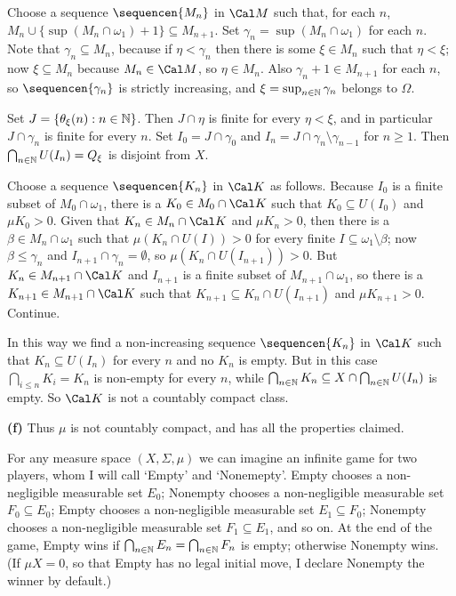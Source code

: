 {\medskip

 Choose a sequence $\sequencen{M_n}$ in $\Cal M$ such
that, for each $n$, $M_n\cup\{\sup(M_n\cap\omega_1)+1\}\subseteq
M_{n+1}$.   Set $\gamma_n=\sup(M_n\cap\omega_1)$ for each $n$.   Note
that $\gamma_n\subseteq M_n$, because if $\eta<\gamma_n$ then there is
some $\xi\in M_n$ such that $\eta<\xi$;  now $\xi\subseteq M_n$
because $M_n\in\Cal M$, so $\eta\in M_n$.   Also
$\gamma_n+1\in M_{n+1}$ for each $n$, so $\sequencen{\gamma_n}$ is
strictly increasing, and $\xi=\sup_{n\in\Bbb N}\gamma_n$ belongs to
$\Omega$.

Set $J=\{\theta_{\xi}(n):n\in\Bbb N\}$.   Then $J\cap\eta$ is finite for
every $\eta<\xi$, and in particular $J\cap\gamma_n$ is finite for every
$n$.   Set $I_0=J\cap\gamma_0$ and
$I_n=J\cap\gamma_n\setminus\gamma_{n-1}$ for $n\ge 1$.   Then
$\bigcap_{n\in\Bbb N}U(I_n)=Q_{\xi}$ is disjoint from $X$.

Choose a sequence $\sequencen{K_n}$ in $\Cal K$ as follows.   Because
$I_0$ is a finite subset of $M_0\cap\omega_1$, there is a $K_0\in
M_0\cap\Cal K$ such that
$K_0\subseteq U(I_0)$ and $\mu K_0>0$.    Given that $K_n\in M_n\cap\Cal
K$ and $\mu K_n>0$, then there is a $\beta\in M_n\cap\omega_1$ such that
$\mu(K_n\cap U(I))>0$ for every finite
$I\subseteq\omega_1\setminus\beta$;  now $\beta\le\gamma_n$ and
$I_{n+1}\cap\gamma_n=\emptyset$, so $\mu(K_n\cap U(I_{n+1}))>0$.   But
$K_n\in M_{n+1}\cap\Cal K$ and $I_{n+1}$ is a finite subset of
$M_{n+1}\cap\omega_1$, so there is a $K_{n+1}\in M_{n+1}\cap\Cal K$ such
that $K_{n+1}\subseteq K_n\cap U(I_{n+1})$ and $\mu K_{n+1}>0$.
Continue.

In this way we find a non-increasing sequence $\sequencen{K_n}$ in $\Cal
K$ such that $K_n\subseteq U(I_n)$ for every $n$ and no $K_n$ is empty.
But in this case $\bigcap_{i\le n}K_i=K_n$ is non-empty for every $n$,
while $\bigcap_{n\in\Bbb N}K_n\subseteq X\cap\bigcap_{n\in\Bbb N}U(I_n)$
is empty.   So $\Cal K$ is not a countably compact class.\ \Bang

\medskip

{\bf (f)} Thus $\mu$ is not countably compact, and has all the
properties claimed.
}%

   For any measure space $(X,\Sigma,\mu)$ we can
imagine an infinite game for two players, whom I will call `Empty' and
`Nonemepty'.   Empty chooses a
non-negligible measurable set $E_0$;  Nonempty chooses a
non-negligible measurable set $F_0\subseteq E_0$;  Empty chooses a
non-negligible measurable set $E_1\subseteq F_0$;  Nonempty chooses a
non-negligible measurable set $F_1\subseteq E_1$, and so on.   At the
end of the game, Empty wins if
$\bigcap_{n\in\Bbb N}E_n=\bigcap_{n\in\Bbb N}F_n$ is empty;  otherwise
Nonempty wins.   (If $\mu X=0$, so that Empty has no legal initial move,
I declare Nonempty the winner by default.)

